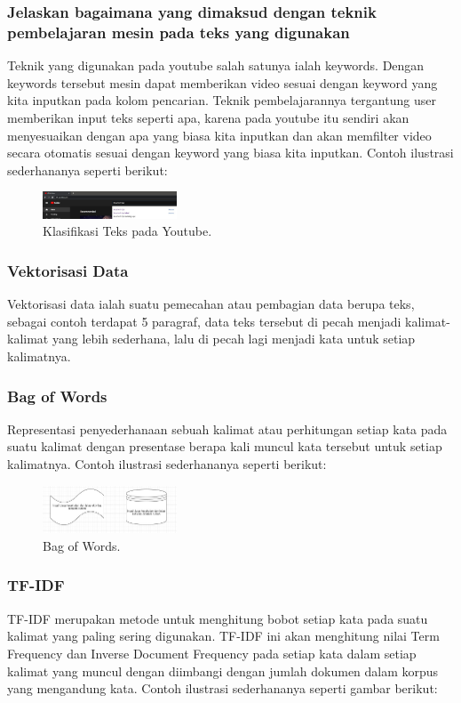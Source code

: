 \subsubsection{Jelaskan bagaimana yang dimaksud dengan teknik pembelajaran mesin pada teks yang digunakan}
\hfill\break
Teknik yang digunakan pada youtube salah satunya ialah keywords. Dengan keywords tersebut mesin dapat memberikan video sesuai dengan keyword yang kita inputkan pada kolom pencarian. Teknik pembelajarannya tergantung user memberikan input teks seperti apa, karena pada youtube itu sendiri akan menyesuaikan dengan apa yang biasa kita inputkan dan akan memfilter video secara otomatis sesuai dengan keyword yang biasa kita inputkan. Contoh ilustrasi sederhananya seperti berikut:

\begin{figure}[H]
\centering
\includegraphics[width=4cm]{figures/1174066/4/3.jpg}
\caption{Klasifikasi Teks pada Youtube.}
\end{figure}

\subsubsection{Vektorisasi Data}
\hfill\break
Vektorisasi data ialah suatu pemecahan atau pembagian data berupa teks, sebagai contoh terdapat 5 paragraf, data teks tersebut di pecah menjadi kalimat-kalimat yang lebih sederhana, lalu di pecah lagi menjadi kata untuk setiap kalimatnya. 

\subsubsection{Bag of Words}
\hfill\break
Representasi penyederhanaan sebuah kalimat atau perhitungan setiap kata pada suatu kalimat dengan presentase berapa kali muncul kata tersebut untuk setiap kalimatnya. Contoh ilustrasi sederhananya seperti berikut: 

\begin{figure}[H]
\centering
\includegraphics[width=4cm]{figures/1174066/4/4.jpg}
\caption{Bag of Words.}
\end{figure}

\subsubsection{TF-IDF}
\hfill\break
TF-IDF merupakan metode untuk menghitung bobot setiap kata pada suatu kalimat yang paling sering digunakan. TF-IDF ini akan menghitung nilai Term Frequency dan Inverse Document Frequency pada setiap kata dalam setiap kalimat yang muncul dengan diimbangi dengan jumlah dokumen dalam korpus yang mengandung kata. Contoh ilustrasi sederhananya seperti gambar berikut: 

